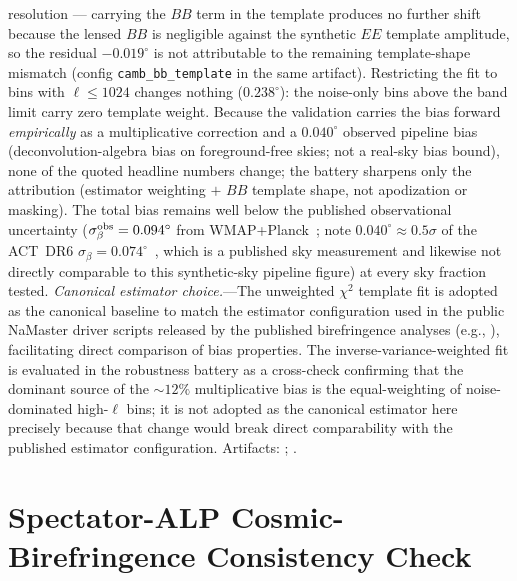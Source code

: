 \documentclass[aps,prd,twocolumn,superscriptaddress,showpacs,preprintnumbers,nofootinbib,longbibliography,floatfix]{revtex4-2}
\begin{document}
resolution --- carrying the $BB$ term in the template produces no further
shift because the lensed $BB$ is negligible against the synthetic $EE$
template amplitude, so the residual $-0.019^\circ$ is not attributable to
the remaining template-shape mismatch (config \texttt{camb\_bb\_template}
in the same artifact). Restricting the fit
to bins with $\ell \le 1024$ changes nothing ($0.238^\circ$): the
noise-only bins above the band limit carry zero template weight. Because
the validation carries the bias forward \emph{empirically} as a
multiplicative correction and a $0.040^\circ$ observed pipeline bias (deconvolution-algebra bias on foreground-free skies; not a real-sky bias bound), none of
the quoted headline numbers change; the battery sharpens only the
attribution (estimator weighting $+$ $BB$ template shape, not
apodization or masking). The total bias remains well below the published observational
uncertainty ($\sigma_\beta^{\rm obs}=0.094^\circ$ from WMAP+Planck~\cite{Eskilt2022}; note $0.040^\circ\approx 0.5\sigma$ of the ACT~DR6 $\sigma_\beta=0.074^\circ$~\cite{DiegoPalazuelos2025}, which is a published sky measurement and likewise not directly comparable to this synthetic-sky pipeline figure) at every sky fraction tested.
\emph{Canonical estimator choice.}---The unweighted $\chi^2$ template fit is
adopted as the canonical baseline to match the estimator configuration used
in the public NaMaster driver scripts released by the published birefringence
analyses (e.g., \cite{Eskilt2022}), facilitating direct comparison of bias
properties.  The inverse-variance-weighted fit is evaluated in the robustness
battery as a cross-check confirming that the dominant source of the ${\sim}12\%$
multiplicative bias is the equal-weighting of noise-dominated high-$\ell$ bins;
it is not adopted as the canonical estimator here precisely because that
change would break direct comparability with the published estimator
configuration.
Artifacts: ;
.




\section{Spectator-ALP Cosmic-Birefringence Consistency Check}\label{app:alp}
\end{document}
